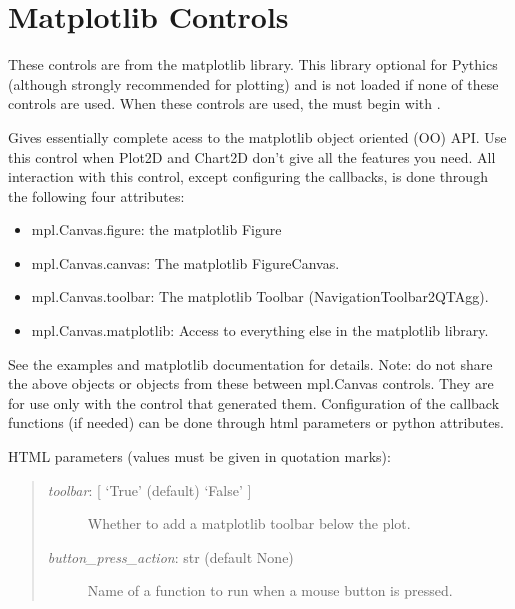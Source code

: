 \documentclass[letterpaper,10pt,english]{sphinxmanual}
\begin{document}
\section{Matplotlib Controls}
\label{api:matplotlib-controls}
These controls are from the matplotlib library. This library optional for
Pythics (although strongly recommended for plotting) and is not loaded if none
of these controls are used. When these controls are used, the  must
begin with .
\label{api:module-mpl}

\begin{fulllineitems}
\label{api:mpl.Canvas}
Gives essentially complete acess to the matplotlib object oriented (OO) 
API. Use this control when Plot2D and Chart2D don't give all the features
you need. All interaction with this control, except configuring the 
callbacks, is done through the following four attributes:
\begin{itemize}
\item {} 
mpl.Canvas.figure: the matplotlib Figure

\item {} 
mpl.Canvas.canvas: The matplotlib FigureCanvas.

\item {} 
mpl.Canvas.toolbar: The matplotlib Toolbar (NavigationToolbar2QTAgg).

\item {} 
mpl.Canvas.matplotlib: Access to everything else in the matplotlib library.

\end{itemize}

See the examples and matplotlib documentation for details. Note: do not 
share the above objects or objects from these between mpl.Canvas controls.
They are for use only with the control that generated them. Configuration 
of the callback functions (if needed) can be done through html parameters 
or python attributes.

HTML parameters (values must be given in quotation marks):
\begin{quote}
\begin{description}
\item[{\emph{toolbar}: {[} `True' (default) \textbar{} `False' {]}}] \leavevmode
Whether to add a matplotlib toolbar below the plot.

\item[{\emph{button\_press\_action}: str (default None)}] \leavevmode
Name of a function to run when a mouse button is pressed.


\end{description}
\end{quote}
\end{fulllineitems}
\end{document}
